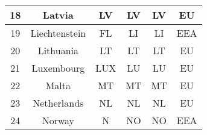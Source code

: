 \begin{table}[!ht]
\begin{tabular}{|c|c|c|c|c|c|}
18           & Latvia                                                                 & LV                                                              & LV                                                          & LV                                                                & EU                                                                 \\ \hline
19           & Liechtenstein                                                          & FL                                                              & LI                                                          & LI                                                                & EEA                                                                \\ \hline
20           & Lithuania                                                              & LT                                                              & LT                                                          & LT                                                                & EU                                                                 \\ \hline
21           & Luxembourg                                                             & LUX                                                             & LU                                                          & LU                                                                & EU                                                                 \\ \hline
22           & Malta                                                                  & MT                                                              & MT                                                          & MT                                                                & EU                                                                 \\ \hline
23           & Netherlands                                                            & NL                                                              & NL                                                          & NL                                                                & EU                                                                 \\ \hline
24           & Norway                                                                 & N                                                               & NO                                                          & NO                                                                & EEA                                                                \\ \hline

\end{tabular}
\end{table}
